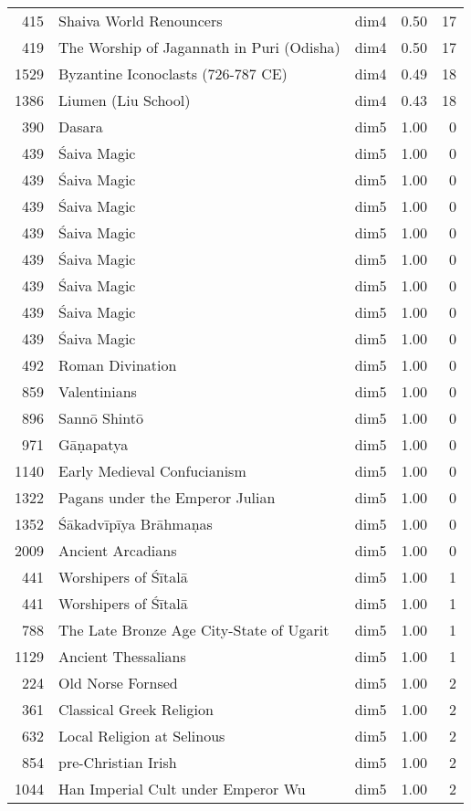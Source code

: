 \begin{tabular}{rllrr}
415 & Shaiva World Renouncers & dim4 & 0.50 & 17 \\
419 & The Worship of Jagannath in Puri (Odisha) & dim4 & 0.50 & 17 \\
1529 & Byzantine Iconoclasts (726-787 CE) & dim4 & 0.49 & 18 \\
1386 & Liumen (Liu School) & dim4 & 0.43 & 18 \\
390 & Dasara & dim5 & 1.00 & 0 \\
439 & Śaiva Magic & dim5 & 1.00 & 0 \\
439 & Śaiva Magic & dim5 & 1.00 & 0 \\
439 & Śaiva Magic & dim5 & 1.00 & 0 \\
439 & Śaiva Magic & dim5 & 1.00 & 0 \\
439 & Śaiva Magic & dim5 & 1.00 & 0 \\
439 & Śaiva Magic & dim5 & 1.00 & 0 \\
439 & Śaiva Magic & dim5 & 1.00 & 0 \\
439 & Śaiva Magic & dim5 & 1.00 & 0 \\
492 & Roman Divination & dim5 & 1.00 & 0 \\
859 & Valentinians & dim5 & 1.00 & 0 \\
896 & Sannō Shintō & dim5 & 1.00 & 0 \\
971 & Gāṇapatya & dim5 & 1.00 & 0 \\
1140 & Early Medieval Confucianism & dim5 & 1.00 & 0 \\
1322 & Pagans under the Emperor Julian & dim5 & 1.00 & 0 \\
1352 & Śākadvīpīya Brāhmaṇas & dim5 & 1.00 & 0 \\
2009 & Ancient Arcadians & dim5 & 1.00 & 0 \\
441 & Worshipers of Śītalā & dim5 & 1.00 & 1 \\
441 & Worshipers of Śītalā & dim5 & 1.00 & 1 \\
788 & The Late Bronze Age City-State of Ugarit & dim5 & 1.00 & 1 \\
1129 & Ancient Thessalians & dim5 & 1.00 & 1 \\
224 & Old Norse Fornsed & dim5 & 1.00 & 2 \\
361 & Classical Greek Religion & dim5 & 1.00 & 2 \\
632 & Local Religion at Selinous & dim5 & 1.00 & 2 \\
854 & pre-Christian Irish & dim5 & 1.00 & 2 \\
1044 & Han Imperial Cult under Emperor Wu & dim5 & 1.00 & 2 \\

\end{tabular}
